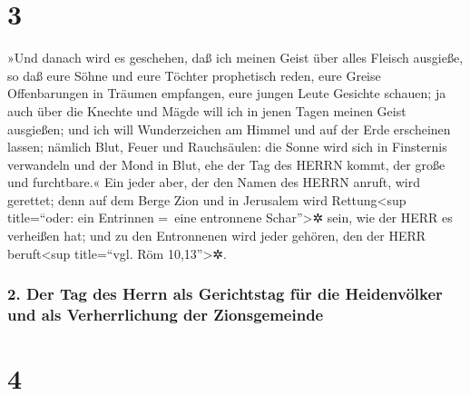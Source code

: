 \hypertarget{section-2}{%
\section{3}\label{section-2}}

»Und danach wird es geschehen, daß ich meinen Geist über
alles Fleisch ausgieße, so daß eure Söhne und eure Töchter prophetisch
reden, eure Greise Offenbarungen in Träumen empfangen, eure jungen Leute
Gesichte schauen; ja auch über die Knechte und Mägde will
ich in jenen Tagen meinen Geist ausgießen; und ich will
Wunderzeichen am Himmel und auf der Erde erscheinen lassen; nämlich
Blut, Feuer und Rauchsäulen: die Sonne wird sich in
Finsternis verwandeln und der Mond in Blut, ehe der Tag des HERRN kommt,
der große und furchtbare.« Ein jeder aber, der den Namen
des HERRN anruft, wird gerettet; denn auf dem Berge Zion und in
Jerusalem wird Rettung\textless sup title=``oder: ein Entrinnen =~eine
entronnene Schar''\textgreater✲ sein, wie der HERR es verheißen hat; und
zu den Entronnenen wird jeder gehören, den der HERR beruft\textless sup
title=``vgl. Röm 10,13''\textgreater✲.

\hypertarget{der-tag-des-herrn-als-gerichtstag-fuxfcr-die-heidenvuxf6lker-und-als-verherrlichung-der-zionsgemeinde}{%
\subsubsection{2. Der Tag des Herrn als Gerichtstag für die Heidenvölker
und als Verherrlichung der
Zionsgemeinde}\label{der-tag-des-herrn-als-gerichtstag-fuxfcr-die-heidenvuxf6lker-und-als-verherrlichung-der-zionsgemeinde}}

\hypertarget{section-3}{%
\section{4}\label{section-3}}

